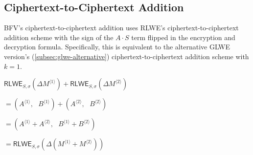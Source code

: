 


\subsection{Ciphertext-to-Ciphertext Addition}
\label{subsec:bfv-add-cipher}

BFV's ciphertext-to-ciphertext addition uses RLWE's ciphertext-to-ciphertext addition scheme with the sign of the $A\cdot S$ term flipped in the encryption and decryption formula. Specifically, this is equivalent to the alternative GLWE version's (\autoref{subsec:glwe-alternative}) ciphertext-to-ciphertext addition scheme with $k = 1$. 


\begin{tcolorbox}[title={\textbf{\tboxlabel{\ref*{subsec:bfv-add-cipher}} BFV Ciphertext-to-Ciphertext Addition}}]
$\textsf{RLWE}_{S, \sigma}(\Delta M^{\langle 1 \rangle} ) + \textsf{RLWE}_{S, \sigma}(\Delta M^{\langle 2 \rangle} ) $

$ = ( A^{\langle 1 \rangle}, \text{ } B^{\langle 1 \rangle}) + (A^{\langle 2 \rangle}, \text{ } B^{\langle 2 \rangle}) $

$ = ( A^{\langle 1 \rangle} + A^{\langle 2 \rangle}, \text{ } B^{\langle 1 \rangle} + B^{\langle 2 \rangle} ) $

$= \textsf{RLWE}_{S, \sigma}(\Delta(M^{\langle 1 \rangle} + M^{\langle 2 \rangle}) )$
\end{tcolorbox}

